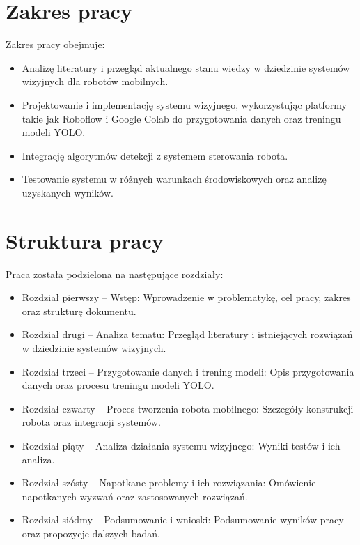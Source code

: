 \documentclass[a4paper,twoside,12pt]{book}
\begin{document}
\newpage

\section{Zakres pracy}

Zakres pracy obejmuje:
\begin{itemize}
    \item Analizę literatury i przegląd aktualnego stanu wiedzy w dziedzinie systemów wizyjnych dla robotów mobilnych.
    \item Projektowanie i implementację systemu wizyjnego, wykorzystując platformy takie jak Roboflow i Google Colab do przygotowania danych oraz treningu modeli YOLO.
    \item Integrację algorytmów detekcji z systemem sterowania robota.
    \item Testowanie systemu w różnych warunkach środowiskowych oraz analizę uzyskanych wyników.
\end{itemize}

\section{Struktura pracy}

Praca została podzielona na następujące rozdziały:
\begin{itemize}
    \item Rozdział pierwszy – Wstęp: Wprowadzenie w problematykę, cel pracy, zakres oraz strukturę dokumentu.
    \item Rozdział drugi – Analiza tematu: Przegląd literatury i istniejących rozwiązań w dziedzinie systemów wizyjnych.
    \item Rozdział trzeci – Przygotowanie danych i trening modeli: Opis przygotowania danych oraz procesu treningu modeli YOLO.
    \item Rozdział czwarty – Proces tworzenia robota mobilnego: Szczegóły konstrukcji robota oraz integracji systemów.
    \item Rozdział piąty – Analiza działania systemu wizyjnego: Wyniki testów i ich analiza.
    \item Rozdział szósty – Napotkane problemy i ich rozwiązania: Omówienie napotkanych wyzwań oraz zastosowanych rozwiązań.
    \item Rozdział siódmy – Podsumowanie i wnioski: Podsumowanie wyników pracy oraz propozycje dalszych badań.
\end{itemize}

\newpage
\end{document}
